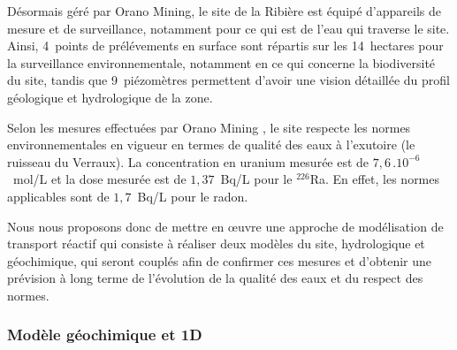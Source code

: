 \documentclass{article}
\newcommand{\blue}[1]{\textcolor{blue}{#1}} %
\begin{document}
Désormais géré par Orano Mining, le site de la Ribière est équipé d'appareils de mesure et de surveillance, notamment pour ce qui est de l’eau qui traverse le site. Ainsi, 4~points de prélévements en surface sont répartis sur les 14~hectares pour la surveillance environnementale, notamment en ce qui concerne la biodiversité du site, tandis que 9~piézomètres permettent d’avoir une vision détaillée du profil géologique et hydrologique de la zone.

Selon les mesures effectuées par Orano Mining \cite{chautard_evaluation_2020}, le site respecte les normes environnementales en vigueur en termes de qualité des eaux à l’exutoire (le ruisseau du Verraux). La concentration en uranium mesurée est de $7,6 \, . 10^{-6}$~mol/L et la dose mesurée est de $1,37$~Bq/L pour le $^{226}$Ra. En effet, les normes applicables sont de $1,7$~Bq/L pour le radon.

Nous nous proposons donc de mettre en œuvre une approche de modélisation de transport réactif qui consiste à réaliser deux modèles du site, hydrologique et géochimique, qui seront couplés afin de confirmer ces mesures et d’obtenir une prévision à long terme de l'évolution de la qualité des eaux et du respect des normes. 

\subsubsection{Modèle géochimique et 1D} \label{subsec:geoch_1D}
\end{document}
